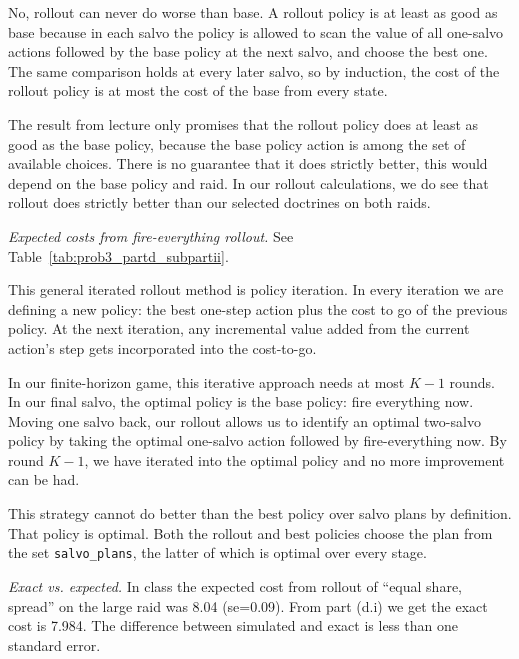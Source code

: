 \documentclass[11pt]{exam}
\begin{document}
\begin{questions}
\begin{parts}
\begin{subparts}
            No, rollout can never do worse than base. A rollout policy is at least as good as base because in each salvo the policy is allowed to scan the value of all one-salvo actions followed by the base policy at the next salvo, and choose the best one. The same comparison holds at every later salvo, so by induction, the cost of the rollout policy is at most the cost of the base from every state.

            The result from lecture only promises that the rollout policy does at least as good as the base policy, because the base policy action is among the set of available choices. There is no guarantee that it does strictly better, this would depend on the base policy and raid. In our rollout calculations, we do see that rollout does strictly better than our selected doctrines on both raids. 

            \subpart \emph{Expected costs from fire-everything rollout.}
            See Table~\ref{tab:prob3_partd_subpartii}.
            \begin{table}[h!]
                \centering
                
                \caption{\label{tab:prob3_partd_subpartii}Problem 3, Part d, Subpart ii}
            \end{table}

            This general iterated rollout method is policy iteration. In every iteration we are defining a new policy: the best one-step action plus the cost to go of the previous policy. At the next iteration, any incremental value added from the current action's step gets incorporated into the cost-to-go. 

            In our finite-horizon game, this iterative approach needs at most $K-1$ rounds. In our final salvo, the optimal policy is the base policy: fire everything now. Moving one salvo back, our rollout allows us to identify an optimal two-salvo policy by taking the optimal one-salvo action followed by fire-everything now. By round $K-1$, we have iterated into the optimal policy and no more improvement can be had. 

            This strategy cannot do better than the best policy over salvo plans by definition. That policy is optimal. Both the rollout and best policies choose the plan from the set \texttt{salvo\_plans}, the latter of which is optimal over every stage.  


            \subpart \emph{Exact vs. expected.} 
            In class the expected cost from rollout of ``equal share, spread'' on the large raid was 8.04 (se=0.09). From part (d.i) we get the exact cost is 7.984. The difference between simulated and exact is less than one standard error. 


\end{subparts}
\end{parts}
\end{questions}
\end{document}
